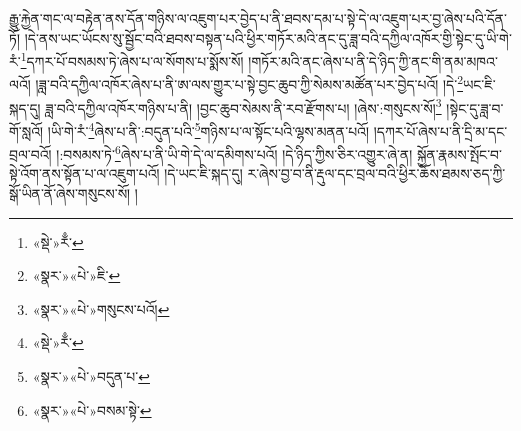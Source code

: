 རྒྱུ་རྐྱེན་གང་ལ་བརྟེན་ནས་དོན་གཉིས་ལ་འཇུག་པར་བྱེད་པ་ནི་ཐབས་དམ་པ་སྟེ་དེ་ལ་འཇུག་པར་བྱ་ཞེས་པའི་དོན་ཏོ། །དེ་ནས་ཡང་ཡོངས་སུ་སྦྱོང་བའི་ཐབས་བསྟན་པའི་ཕྱིར་གཏོར་མའི་ནང་དུ་ཟླ་བའི་དཀྱིལ་འཁོར་གྱི་སྟེང་དུ་ཡི་གེ་རཾ་\footnote{«སྡེ་»རྃ་}དཀར་པོ་བསམས་ཏེ་ཞེས་པ་ལ་སོགས་པ་སྨོས་སོ། །གཏོར་མའི་ནང་ཞེས་པ་ནི་དེ་ཉིད་ཀྱི་ནང་གི་ནམ་མཁའ་ལའོ། །ཟླ་བའི་དཀྱིལ་འཁོར་ཞེས་པ་ནི་ཨ་ལས་གྱུར་པ་སྟེ་བྱང་ཆུབ་ཀྱི་སེམས་མཚོན་པར་བྱེད་པའོ། །དེ་\footnote{«སྣར་»«པེ་»ཇི་}ཡང་ཇི་སྐད་དུ། ཟླ་བའི་དཀྱིལ་འཁོར་གཉིས་པ་ནི། །བྱང་ཆུབ་སེམས་ནི་རབ་རྫོགས་པ། །ཞེས་:གསུངས་སོ།\footnote{«སྣར་»«པེ་»གསུངས་པའོ།} །སྟེང་དུ་ཟླ་བ་གོ་སླའོ། །ཡི་གེ་རཾ་\footnote{«སྡེ་»རྃ་}ཞེས་པ་ནི་:བདུན་པའི་\footnote{«སྣར་»«པེ་»བདུན་པ་}གཉིས་པ་ལ་སྟོང་པའི་ལྷས་མནན་པའོ། །དཀར་པོ་ཞེས་པ་ནི་དྲི་མ་དང་བྲལ་བའོ། །:བསམས་ཏེ་\footnote{«སྣར་»«པེ་»བསམ་སྟེ་}ཞེས་པ་ནི་ཡི་གེ་དེ་ལ་དམིགས་པའོ། །དེ་ཉིད་ཀྱིས་ཅིར་འགྱུར་ཞེ་ན། སྐྱོན་རྣམས་སྤོང་བ་སྟེ་འོག་ནས་སྟོན་པ་ལ་འཇུག་པའོ། །དེ་ཡང་ཇི་སྐད་དུ། ར་ཞེས་བྱ་བ་ནི་རྡུལ་དང་བྲལ་བའི་ཕྱིར་ཆོས་ཐམས་ཅད་ཀྱི་སྒོ་ཡིན་ནོ་ཞེས་གསུངས་སོ། །
